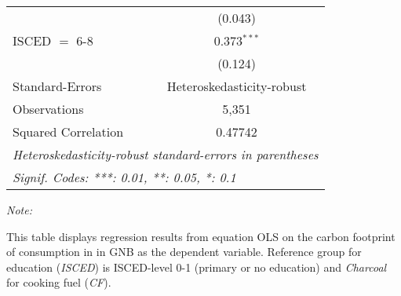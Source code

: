 \begin{table}[htbp!]
\begin{adjustbox}{width = 1\textwidth, max height = 0.95\textheight, center}
\begin{threeparttable}[b]
\begin{tabular}{lc}
                                & (0.043)\\   
            ISCED $=$ 6-8       & 0.373$^{***}$\\   
                                & (0.124)\\   
            \midrule 
            Standard-Errors     & Heteroskedasticity-robust \\   
            Observations        & 5,351\\  
            Squared Correlation & 0.47742\\  
            \midrule \midrule
            \multicolumn{2}{l}{\emph{Heteroskedasticity-robust standard-errors in parentheses}}\\
            \multicolumn{2}{l}{\emph{Signif. Codes: ***: 0.01, **: 0.05, *: 0.1}}\\
         \end{tabular}
         
         \begin{tablenotes}\item \medskip \textit{Note:}
            \item This table displays regression results from equation OLS on the carbon footprint of consumption in  in GNB as the dependent variable.  Reference group for education (\textit{ISCED}) is ISCED-level 0-1 (primary or no education) and \textit{Charcoal} for cooking fuel (\textit{CF}).
         \end{tablenotes}
      \end{threeparttable}
   \end{adjustbox}
\end{table}


